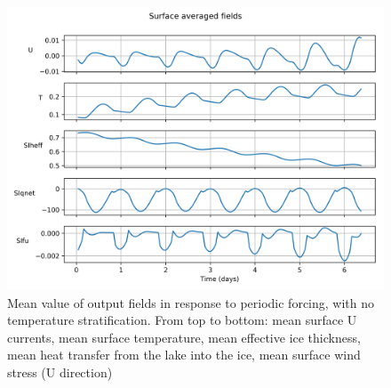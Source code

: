 \documentclass[11pt]{article}
\begin{document}
\begin{figure}[h!]
\includegraphics[width=\linewidth]{periodicForcing/response-constantT-fields}
\caption{Mean value of output fields in response to periodic forcing, with no temperature stratification. From top to bottom: mean surface U currents, mean surface temperature, mean effective ice thickness, mean heat transfer from the lake into the ice, mean surface wind stress (U direction)}
\label{fig:periodicForcingResponseConstantT}
\end{figure}
\end{document}
